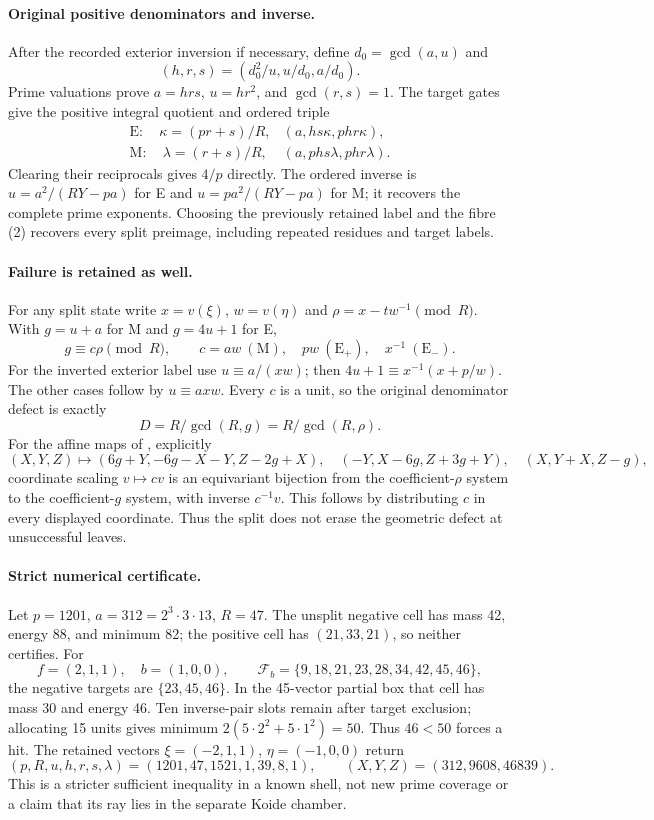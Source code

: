 \paragraph{Original positive denominators and inverse.}
After the recorded exterior inversion if necessary, define
$d_0=\gcd(a,u)$ and
\[
 (h,r,s)=(d_0^2/u,u/d_0,a/d_0).
\]
Prime valuations prove $a=hrs$, $u=hr^2$, and $\gcd(r,s)=1$.
The target gates give the positive integral quotient and ordered triple
\[
 \begin{array}{ll}
 \mathrm E:\quad\kappa=(pr+s)/R,&(a,hs\kappa,phr\kappa),\\
 \mathrm M:\quad\lambda=(r+s)/R,&(a,phs\lambda,phr\lambda).
 \end{array}                                                   \tag{6}
\]
Clearing their reciprocals gives $4/p$ directly. The ordered inverse is
$u=a^2/(RY-pa)$ for E and $u=pa^2/(RY-pa)$ for M; it recovers the complete
prime exponents. Choosing the previously retained label and the fibre (2)
recovers every split preimage, including repeated residues and target labels.

\paragraph{Failure is retained as well.}
For any split state write $x=v(\xi)$, $w=v(\eta)$ and
$\rho=x-tw^{-1}\pmod R$. With $g=u+a$ for M and $g=4u+1$ for E,
\[
 g\equiv c\rho\pmod R,\qquad
 c=aw\ (\mathrm M),\quad pw\ (\mathrm E_+),\quad x^{-1}\ (\mathrm E_-).
 \tag{7}
\]
For the inverted exterior label use $u\equiv a/(xw)$; then
$4u+1\equiv x^{-1}(x+p/w)$. The other cases follow by $u\equiv axw$.
Every $c$ is a unit, so the original denominator defect is exactly
\[
 \boxed{D=R/\gcd(R,g)=R/\gcd(R,\rho).}                         \tag{8}
\]
For the affine maps of \cite{Hex}, explicitly
\[
 (X,Y,Z)\mapsto(6g+Y,-6g-X-Y,Z-2g+X),\quad
 (-Y,X-6g,Z+3g+Y),\quad(X,Y+X,Z-g),
\]
coordinate scaling $v\mapsto cv$ is an equivariant bijection from the
coefficient-$\rho$ system to the coefficient-$g$ system, with inverse
$c^{-1}v$. This follows by distributing $c$ in every displayed coordinate.
Thus the split does not erase the geometric defect at unsuccessful leaves.

\paragraph{Strict numerical certificate.}
Let $p=1201$, $a=312=2^3\cdot3\cdot13$, $R=47$. The unsplit negative
cell has mass 42, energy 88, and minimum 82; the positive cell has
$(21,33,21)$, so neither certifies. For
\[
 f=(2,1,1),\quad b=(1,0,0),\qquad
 \mathcal F_b=\{9,18,21,23,28,34,42,45,46\},
\]
the negative targets are $\{23,45,46\}$. In the 45-vector partial box
that cell has mass 30 and energy 46. Ten inverse-pair slots remain after
target exclusion; allocating 15 units gives minimum
$2(5\cdot2^2+5\cdot1^2)=50$. Thus $46<50$ forces a hit. The retained
vectors $\xi=(-2,1,1)$, $\eta=(-1,0,0)$ return
\[
 (p,R,u,h,r,s,\lambda)=(1201,47,1521,1,39,8,1),\qquad
 (X,Y,Z)=(312,9608,46839).
\]
This is a stricter sufficient inequality in a known shell, not new prime
coverage or a claim that its ray lies in the separate Koide chamber.

